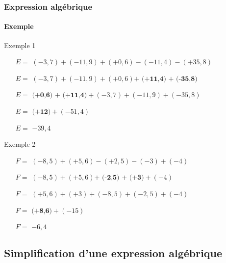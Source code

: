 \documentclass{beamer}
\begin{document}
\begin{frame}[allowframebreaks]
	\frametitle{Expression algébrique}  
	\framesubtitle{Exemple }	
	
	
	\begin{exampleblock}{Exemple 1}
		\begin{itemize}
			\item[$E=$] $(-3,7) + (-11,9) + (+0,6) - (-11,4) - (+35,8)$
			\item[$E=$] $(-3,7) + (-11,9) + (+0,6) \textbf{+ (+11,4) + (-35,8)}$
			\item[$E=$] $\textbf{(+0,6) + (+11,4)} + (-3,7) + (-11,9) + (-35,8)$
			\item[$E=$] $\textbf{(+12)} + (-51,4)$
			\item[$E=$] $ -39,4 $
		\end{itemize}		
	\end{exampleblock}
	
	\begin{exampleblock}{Exemple 2}
		\begin{itemize}
			\item[$F=$] $(-8,5) + (+5,6) - (+2,5) - (-3) + (-4)$
			\item[$F=$] $(-8,5) + (+5,6) \textbf{+ (-2,5) + (+3)} + (-4)$
			\item[$F=$] $ (+5,6) + (+3) + (-8,5) + (-2,5) + (-4)$
			\item[$F=$] $\textbf{(+8,6)} + (-15)$
			\item[$F=$] $ -6,4 $
		\end{itemize}		
	\end{exampleblock}
\end{frame}
	
\subsection{Simplification d'une expression algébrique}
\end{document}
